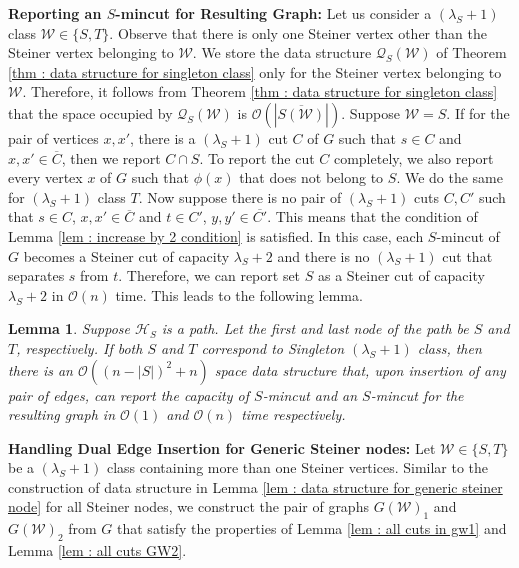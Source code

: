 \documentclass[letterpaper,11pt]{article}
\newtheorem{lemma}{Lemma}[]
\begin{document}
\noindent
\textbf{Reporting an $S$-mincut for Resulting Graph:} Let us consider a $(\lambda_S+1)$ class ${\mathcal W}\in \{S,T\}$. Observe that there is only one Steiner vertex other than the Steiner vertex belonging to ${\mathcal W}$. We store the data structure ${\mathcal Q}_S({\mathcal W})$ of Theorem \ref{thm : data structure for singleton class} only for the Steiner vertex belonging to ${\mathcal W}$. Therefore, it follows from Theorem \ref{thm : data structure for singleton class} that the space occupied by ${\mathcal Q}_S({\mathcal W})$ is ${\mathcal O}(|\overline{S({\mathcal W})}|)$. Suppose ${\mathcal W}=S$. If for the pair of vertices $x,x'$, there is a $(\lambda_S+1)$ cut $C$ of $G$ such that $s\in C$ and $x,x'\in \overline{C}$, then we report $C\cap S$. To report the cut $C$ completely, we also report every vertex $x$ of $G$ such that $\phi(x)$ that does not belong to $S$. We do the same for $(\lambda_S+1)$ class $T$. Now suppose there is no pair of $(\lambda_S+1)$ cuts $C,C'$ such that $s\in C$, $x,x'\in \overline{C}$ and  $t\in C'$, $y,y'\in \overline{C'}$. This means that the condition of Lemma \ref{lem : increase by 2 condition} is satisfied. In this case, each $S$-mincut of $G$ becomes a Steiner cut of capacity $\lambda_S+2$ and there is no $(\lambda_S+1)$ cut that separates $s$ from $t$. Therefore, we can report set $S$ as a Steiner cut of capacity $\lambda_S+2$ in ${\mathcal O}(n)$ time. This leads to the following lemma.
\begin{lemma} \label{lem : data structure for dual edge insertion in singleton class}
    Suppose ${\mathcal H}_S$ is a path. Let the first and last node of the path be $S$ and $T$, respectively. If both $S$ and $T$ correspond to Singleton $(\lambda_S+1)$ class, then there is an ${\mathcal O}((n-|S|)^2+n)$ space data structure that, upon insertion of any pair of edges, can report the capacity of $S$-mincut and an $S$-mincut for the resulting graph in ${\mathcal O}(1)$ and ${\mathcal O}(n)$ time respectively.
\end{lemma}
\noindent
\textbf{Handling Dual Edge Insertion for Generic Steiner nodes:} Let ${\mathcal W}\in \{S,T\}$ be a $(\lambda_S+1)$ class containing more than one Steiner vertices. Similar to the construction of data structure in Lemma \ref{lem : data structure for generic steiner node} for all Steiner nodes, we construct the pair of graphs $G({\mathcal W})_1$ and $G({\mathcal W})_2$ from $G$ that satisfy the properties of Lemma \ref{lem : all cuts in gw1} and Lemma \ref{lem : all cuts GW2}.
\end{document}
